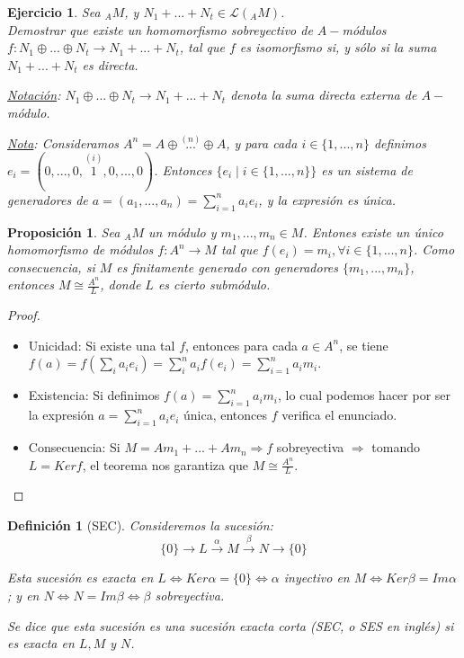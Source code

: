 \documentclass[11pt,a4paper]{article}
\theoremstyle{break}
\newtheorem{definition}[theorem]{Definición}
\newtheorem{proposition}[theorem]{Proposición}
\newtheorem{task}[theorem]{Ejercicio}
\begin{document}
\begin{task}
Sea $_{A}M$, y $N_{1} + ... + N_{t} \in \mathcal{L}(_{A}M)$. \\
Demostrar que existe un homomorfismo sobreyectivo de $A-$módulos $f: N_{1} \oplus ... \oplus N_{t} \to N_{1} + ... + N_{t}$, tal que $f$ es isomorfismo si, y sólo si la suma $N_{1} + ... + N_{t}$ es directa.

\underline{Notación}: $N_{1} \oplus ... \oplus N_{t} \to N_{1} + ... + N_{t}$ denota la suma directa externa de $A-$módulo.

\underline{Nota}: Consideramos $A^{n} = A \oplus \overset{(n)}{...} \oplus A$, y para cada $i \in \{1, ..., n\}$ definimos $e_{i} = (0, ..., 0, \overset{(i)}{1}, 0, ..., 0)$. Entonces $\{e_{i} \mid i \in \{1, ..., n\}\}$ es un sistema de generadores de $a = (a_{1}, ..., a_{n}) = \sum_{i=1}^{n} a_{i} e_{i}$, y la expresión es única.
\end{task}

\begin{proposition}
Sea $_{A}M$ un módulo y $m_{1}, ..., m_{n} \in M$. Entones existe un único homomorfismo de módulos $f: A^{n} \to M$ tal que $f(e_{i}) = m_{i}, \forall i \in \{1, ..., n\}$. Como consecuencia, si $M$ es finitamente generado con generadores $\{m_{1}, ..., m_{n}\}$, entonces $M \cong \frac{A^{n}}{L}$, donde $L$ es cierto submódulo.
\end{proposition}

\begin{proof}
\begin{itemize}
\item Unicidad: Si existe una tal $f$, entonces para cada $a \in A^{n}$, se tiene $f(a) = f(\sum_{i} a_{i}e_{i}) = \sum_{i}^{n} a_{i} f(e_{i}) = \sum_{i=1}^{n} a_{i}m_{i}$.
\item Existencia: Si definimos $f(a) = \sum_{i=1}^{n} a_{i}m_{i}$, lo cual podemos hacer por ser la expresión $a = \sum_{i=1}^{n} a_{i}e_{i}$ única, entonces $f$ verifica el enunciado.
\item Consecuencia: Si $M = Am_{1} + ... + Am_{n} \Rightarrow f$ sobreyectiva $\Rightarrow$ tomando $L = Kerf$, el teorema nos garantiza que $M \cong \frac{A^{n}}{L}$.
\end{itemize}
\end{proof}

\begin{definition}[SEC]
Consideremos la sucesión:
$$\{0\} \to L \overset{\alpha}{\to} M \overset{\beta}{\to} N \to \{0\}$$

Esta sucesión es exacta en $L \iff Ker \alpha = \{0\} \iff \alpha$ inyectivo en $M \iff Ker \beta = Im \alpha$; y en $N \iff N = Im \beta \iff \beta$ sobreyectiva.

Se dice que esta sucesión es una sucesión exacta corta (SEC, o SES en inglés) si es exacta en $L, M$ y $N$.
\end{definition}
\end{document}
